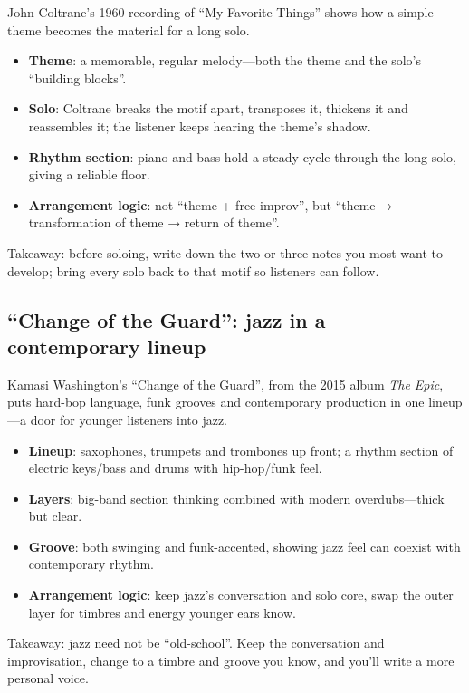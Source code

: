 John Coltrane's 1960 recording of ``My Favorite Things'' shows how a simple theme becomes the material for a long solo.

\begin{itemize}
\item \textbf{Theme}: a memorable, regular melody---both the theme and the solo's ``building blocks''.
\item \textbf{Solo}: Coltrane breaks the motif apart, transposes it, thickens it and reassembles it; the listener keeps hearing the theme's shadow.
\item \textbf{Rhythm section}: piano and bass hold a steady cycle through the long solo, giving a reliable floor.
\item \textbf{Arrangement logic}: not ``theme + free improv'', but ``theme → transformation of theme → return of theme''.
\end{itemize}

Takeaway: before soloing, write down the two or three notes you most want to develop; bring every solo back to that motif so listeners can follow.

\subsection{``Change of the Guard'': jazz in a contemporary lineup}
\label{sec:jazz-case-change-of-guard}

Kamasi Washington's ``Change of the Guard'', from the 2015 album \emph{The Epic}, puts hard-bop language, funk grooves and contemporary production in one lineup---a door for younger listeners into jazz.

\begin{itemize}
\item \textbf{Lineup}: saxophones, trumpets and trombones up front; a rhythm section of electric keys/bass and drums with hip-hop/funk feel.
\item \textbf{Layers}: big-band section thinking combined with modern overdubs---thick but clear.
\item \textbf{Groove}: both swinging and funk-accented, showing jazz feel can coexist with contemporary rhythm.
\item \textbf{Arrangement logic}: keep jazz's conversation and solo core, swap the outer layer for timbres and energy younger ears know.
\end{itemize}

Takeaway: jazz need not be ``old-school''. Keep the conversation and improvisation, change to a timbre and groove you know, and you'll write a more personal voice.

